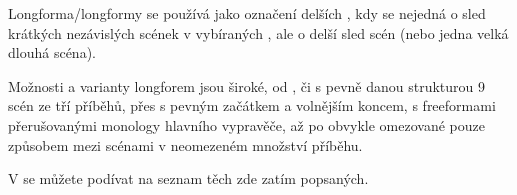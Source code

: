 \documentclass[main.tex]{subfiles}
\begin{document}
\needspace{5cm} \label{longforma} Longforma/longformy se používá jako označení delších , kdy se nejedná 
o sled krátkých nezávislých scének v  vybíraných ,  
ale o delší sled scén (nebo jedna velká dlouhá scéna). 
 
Možnosti  a varianty longforem jsou široké, od , či  s pevně danou strukturou 9 scén ze tří příběhů, 
přes  s pevným začátkem a volnějším koncem,   s freeformami přerušovanými monology hlavního vypravěče,   
až po  obvykle omezované pouze způsobem  mezi scénami v neomezeném množství příběhu. 
 
V  se můžete podívat na seznam těch  zde zatím popsaných. 
 
 
\end{document}
